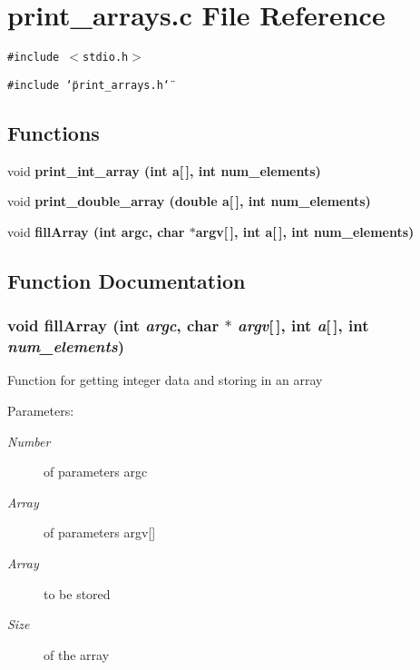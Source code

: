 \section{print\_\-arrays.c File Reference}
\label{print__arrays_8c}
{\tt \#include $<$stdio.h$>$}\par
{\tt \#include \char`\"{}print\_\-arrays.h\char`\"{}}\par
\subsection*{Functions}
\begin{CompactItemize}
\item 
void \bf{print\_\-int\_\-array} (int a[$\,$], int num\_\-elements)
\item 
void \bf{print\_\-double\_\-array} (double a[$\,$], int num\_\-elements)
\item 
void \bf{fill\-Array} (int argc, char $\ast$argv[$\,$], int a[$\,$], int num\_\-elements)
\end{CompactItemize}


\subsection{Function Documentation}
\subsubsection{\setlength{\rightskip}{0pt plus 5cm}void fill\-Array (int {\em argc}, char $\ast$ {\em argv}[$\,$], int {\em a}[$\,$], int {\em num\_\-elements})}\label{print__arrays_8c_2a814cdfc58694c0558c1b809df1b766}


Function for getting integer data and storing in an array \begin{Desc}
\item[Parameters:]
\begin{description}
\item[{\em Number}]of parameters argc \item[{\em Array}]of parameters argv[] \item[{\em Array}]to be stored \item[{\em Size}]of the array \end{description}
\end{Desc}
